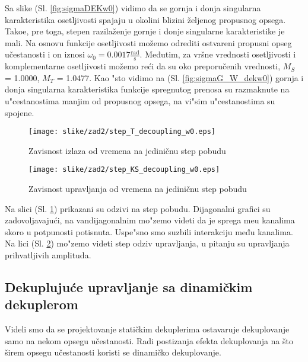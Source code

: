 \documentclass[a4paper,11pt]{article}
\theoremstyle{definition} \newtheorem{deff}{Definicija}[section]
\theoremstyle{definition} \newtheorem{prim}[deff]{Primer}
\theoremstyle{plain} \newtheorem{teor}[deff]{Teorema}
\begin{document}
	\hspace{2cm}
	
	Sa slike (Sl. \ref{fig:sigmaDEKw0}) vidimo da se gornja i donja singularna karakteristika osetljivosti spajaju u okolini blizini željenog propusnog opsega. Tako\dj{}e, pre toga, stepen razilaženje gornje i donje singularne karakteristike je mali. Na osnovu funkcije osetljivosti možemo odrediti ostvareni propusni opseg učestanosti i on iznosi $\omega_0 = 0.0017 \frac{\text{rad}}{\text{s}}$. Međutim, za vršne vrednosti osetljivosti i komplementarne osetljivosti možemo reći da su oko preporučenih vrednosti, $M_S$ = 1.0000, $M_T$ = 1.0477. Kao "sto vidimo na (Sl. \ref{fig:sigmaG_W_dekw0}) gornja i donja singularna karakteristika funkcije spregnutog prenosa su razmaknute na u"cestanostima manjim od propusnog opsega, na vi"sim u"cestanostima su spojene.
	
	
	
	
	\newpage
	
	\begin{figure}[!ht]
		\centering
		\texttt{[image: slike/zad2/step\_T\_decoupling\_w0.eps]}
		\caption{Zavisnost izlaza od vremena na jediničnu step pobudu}
		\label{fig:stepT_dekW0}
	\end{figure}
	
	\begin{figure}[!ht]
		\centering
		\texttt{[image: slike/zad2/step\_KS\_decoupling\_w0.eps]}
		\caption{Zavisnost upravljanja od vremena na jediničnu step pobudu}
		\label{fig:stepKS_dekW0}
	\end{figure}
	
	Na slici (Sl. \ref{fig:stepT_dekW0}) prikazani su odzivi na step pobudu. Dijagonalni grafici su zadovoljavajući, na vandijagonalnim mo"zemo videti da je sprega me\dj{}u kanalima skoro u potpunosti potisnuta. Uspe"sno smo suzbili interakciju među kanalima. Na lici (Sl. \ref{fig:stepKS_dekW0}) mo"zemo videti step odziv upravljanja, u pitanju su upravljanja prihvatljivih amplituda.
	
	
	\newpage
	
	
	\newpage
	\subsection{Dekuplujuće upravljanje sa dinamičkim dekuplerom}
	
	Videli smo da se projektovanje statičkim dekuplerima ostavaruje dekuplovanje samo na nekom opsegu učestanosti. Radi postizanja efekta dekuplovanja na što širem opsegu učestanosti koristi se dinamičko dekuplovanje. \\
	
\end{document}
